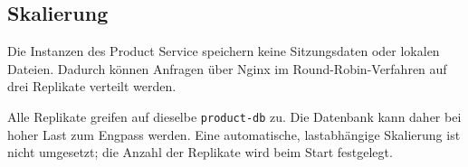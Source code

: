 \subsection{Skalierung}

Die Instanzen des Product Service speichern keine Sitzungsdaten oder lokalen
Dateien. Dadurch können Anfragen über Nginx im Round-Robin-Verfahren auf drei
Replikate verteilt werden.

Alle Replikate greifen auf dieselbe \texttt{product-db} zu. Die Datenbank
kann daher bei hoher Last zum Engpass werden. Eine automatische,
lastabhängige Skalierung ist nicht umgesetzt; die Anzahl der Replikate wird
beim Start festgelegt.